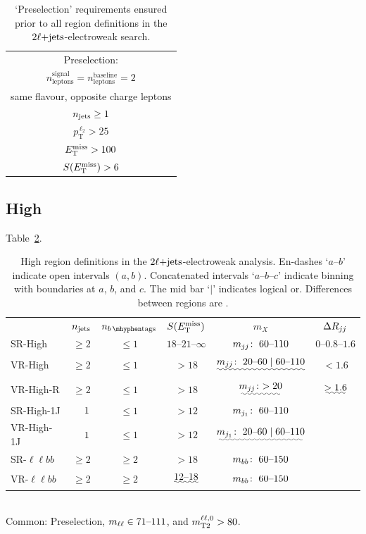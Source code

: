 \begin{table}[tp]
\centering
\begin{tabular}{c}
Preselection:
\\[1em]
$n_\mathrm{leptons}^\mathrm{signal} = n_\mathrm{leptons}^\mathrm{baseline} = 2$
\\[.5em]
same flavour, opposite charge leptons
\\[.5em]
$n_\mathrm{jets} \geq 1$
\\[.5em]
$p_\mathrm{T}^{\,\ell_2} > 25$
\\[.5em]
$E_\mathrm{T}^\mathrm{miss} > 100$
\\[.5em]
$S(E_\mathrm{T}^\mathrm{miss}) > 6$
\end{tabular}
\caption{%
`Preselection' requirements ensured prior to all region definitions in the
$2\ell\mathrm{+jets}$-electroweak search.
}
\label{tab:2ljets_presel}
\end{table}


\subsection{High}
\label{sec:2ljets_high}

Table~\ref{tab:2ljets_high}.

\begin{table}[tp]
\centering
\begin{tabular}{lccccc}
& $n_\mathrm{jets}$
& $\nbtag$
& $S(E_\mathrm{T}^\mathrm{miss})$
& $m_X$
& $\Delta R_{jj}$
\\[1em]
SR-High
& $\geq2$
& $\leq 1$
& $18\textrm{--}21\textrm{--}\infty$
& $m_{jj}\!:~  60\textrm{--}110$
& $0\textrm{--}0.8\textrm{--}1.6$
\\[.5em]
\: VR-High
& $\geq2$
& $\leq 1$
& $> 18$
& $\uwave{\mjj\!:~  20\textrm{--}60 \mid 60\textrm{--}110}$
& $< 1.6$
\\[.5em]
\: VR-High-R
& $\geq 2$
& $\leq 1$
& $> 18$
& $\uwave{\mjj\!:~  > 20}$
& $\uwave{> 1.6}$
\\[1em]
SR-High-1J
& $\hphantom{\geq}~1$
& $\leq 1$
& $> 12$
& $m_{j_1}\!:~  60\textrm{--}110$
&
\\[.5em]
\: VR-High-1J
& $\hphantom{\geq}~1$
& $\leq 1$
& $> 12$
& $\uwave{\mjetone\!:~  20\textrm{--}60 \mid 60\textrm{--}110}$
&
\\[1em]
SR-$\ell\ell bb$
& $\geq 2$
& $\geq 2$
& $> 18$
& $m_{bb}\!:~  60\textrm{--}150$
&
\\[.5em]
\: VR-$\ell\ell bb$
& $\geq 2$
& $\geq 2$
& $\uwave{12\textrm{--}18}$
& $m_{bb}\!:~  60\textrm{--}150$
&
\end{tabular}
\\[1em]
Common: Preselection,
$m_{\ell\ell} \in 71\textrm{--}111$, and
$m_\mathrm{T2}^{\ell\ell,0} > 80$.
\caption{%
High region definitions in the $2\ell\mathrm{+jets}$-electroweak analysis.
En-dashes `$a\textrm{--}b$' indicate open intervals $(a, b)$.
Concatenated intervals `$a\textrm{--}b\textrm{--}c$' indicate binning
with boundaries at $a$, $b$, and $c$.
The mid bar `$\mid$' indicates logical or.
Differences between regions are .
}
\label{tab:2ljets_high}
\end{table}



